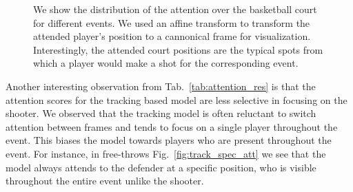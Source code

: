 \documentclass[10pt,twocolumn,letterpaper]{article}
\begin{document}
\begin{figure}[t!]
\begin{center}

\end{center}
   \caption{We show the distribution of the attention over the basketball court
     for different events. We used an affine transform to transform the
     attended player's position to a cannonical frame for visualization.
     Interestingly, the attended court positions are the typical spots from
     which a player would make a shot for the corresponding event.
   }
\label{fig:att_heatmap}
\end{figure}


Another interesting observation from Tab.~\ref{tab:attention_res} is that the
attention scores for the tracking based model are less selective in focusing on
the shooter.  We observed that the tracking model is often reluctant to switch
attention between frames and tends to focus on a single player throughout the
event. This biases the model towards players who are present throughout the
event. For instance, in free-throws Fig.~\ref{fig:track_spec_att} we see that
the model always attends to the defender at a specific position, who is visible
throughout the entire event unlike the shooter.

{\small


}
\end{document}
